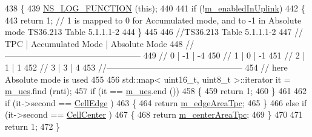 \begin{DoxyCode}
438 \{
439   \hyperlink{log-macros-disabled_8h_a90b90d5bad1f39cb1b64923ea94c0761}{NS\_LOG\_FUNCTION} (\textcolor{keyword}{this});
440 
441   \textcolor{keywordflow}{if} (!\hyperlink{classns3_1_1LteFfrAlgorithm_a6c681821267dfedf7083600005db4bee}{m\_enabledInUplink})
442     \{
443       \textcolor{keywordflow}{return} 1;     \textcolor{comment}{// 1 is mapped to 0 for Accumulated mode, and to -1 in Absolute mode TS36.213 Table
       5.1.1.1-2}
444     \}
445 
446   \textcolor{comment}{//TS36.213 Table 5.1.1.1-2}
447   \textcolor{comment}{//   TPC   |   Accumulated Mode  |  Absolute Mode}
448   \textcolor{comment}{//------------------------------------------------}
449   \textcolor{comment}{//    0    |         -1          |      -4}
450   \textcolor{comment}{//    1    |          0          |      -1}
451   \textcolor{comment}{//    2    |          1          |       1}
452   \textcolor{comment}{//    3    |          3          |       4}
453   \textcolor{comment}{//------------------------------------------------}
454   \textcolor{comment}{// here Absolute mode is used}
455 
456   std::map< uint16\_t, uint8\_t >::iterator it = \hyperlink{classns3_1_1LteFrSoftAlgorithm_a571117042ed967faa798f96b0200e84e}{m\_ues}.find (rnti);
457   \textcolor{keywordflow}{if} (it == \hyperlink{classns3_1_1LteFrSoftAlgorithm_a571117042ed967faa798f96b0200e84e}{m\_ues}.end ())
458     \{
459       \textcolor{keywordflow}{return} 1;
460     \}
461 
462   \textcolor{keywordflow}{if} (it->second == \hyperlink{classns3_1_1LteFrSoftAlgorithm_a8ec0c327bae4119de159dccccb90d029adf66a42bcef8dc451a9349295ab1401c}{CellEdge} )
463     \{
464       \textcolor{keywordflow}{return} \hyperlink{classns3_1_1LteFrSoftAlgorithm_a10741f1e92877b05db224b19c79f4782}{m\_edgeAreaTpc};
465     \}
466   \textcolor{keywordflow}{else} \textcolor{keywordflow}{if} (it->second == \hyperlink{classns3_1_1LteFrSoftAlgorithm_a8ec0c327bae4119de159dccccb90d029ade368b7d62c45fa8d70158a36f64f360}{CellCenter} )
467     \{
468       \textcolor{keywordflow}{return} \hyperlink{classns3_1_1LteFrSoftAlgorithm_a5e508c0c0a988db791c4488f822c8aa4}{m\_centerAreaTpc};
469     \}
470 
471   \textcolor{keywordflow}{return} 1;
472 \}
\end{DoxyCode}
